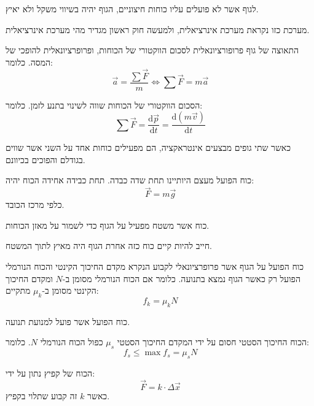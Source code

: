 \documentclass{tstextbook}
\begin{document}
\begin{proposition}
לגוף אשר לא פועלים עליו כוחות חיצוניים, הגוף יהיה בשיווי משקל ולא יאיץ.

\end{proposition}
\begin{remark}
מערכת כזו נקראת מערכת אינרציאלית, ולמעשה חוק ראשון מגדיר מהי מערכת אינרציאלית.

\end{remark}
\begin{proposition}
התאוצה של גוף פרופורציונאלית לסכום הווקטורי של הכוחות, ופרופרציונאלית להופכי של המסה. כלומר:
$$\vec{a}=\frac{\sum \vec{F}}{m}\iff \sum \vec{F}=m\vec{a}$$

\end{proposition}
\begin{corollary}
הסכום הווקטורי של הכוחות שווה לשינוי בתנע לזמן. כלומר:
$$\sum\vec{F}=\frac{\mathrm{d} \vec{p}}{\mathrm{d} t} =\frac{\mathrm{d} \left( m\vec{v} \right)}{\mathrm{d}t } $$

\end{corollary}
\begin{proposition}
כאשר שתי גופים מבצעים אינטראקציה, הם מפעילים כוחות אחד על השני אשר שווים בגודלם והפוכים בכיוונם.

\end{proposition}
\begin{definition}
כוח הפועל מעצם היותיינו תחת שדה כבדה. תחת כבידה אחידה הכוח יהיה:
$$\vec{F}=m\vec{g}$$
כלפי מרכז הכובד. 

\end{definition}
\begin{definition}
כוח אשר משטח מפעיל על הגוף כדי לשמור על מאזן הכוחות.

\end{definition}
\begin{remark}
חייב להיות קיים כוח כזה אחרת הגוף היה מאיץ לתוך המשטח.

\end{remark}
\begin{definition}
כוח הפועל על הגוף אשר פרופרציונאלי לקבוע הנקרא מקדם החיכוך הקינטי והכוח הנורמלי הפועל רק כאשר הגוף נמצא בתנועה. כלומר אם הכוח הנורמלי מסומן ב-\(N\) ומקדם החיכוך הקינטי מסומן ב-\(\mu_{k}\) מתקיים:
$$f_{k}=\mu_{k}N$$

\end{definition}
\begin{definition}
כוח הפועל אשר פועל למנועת תנועה.

\end{definition}
\begin{proposition}
הכוח החיכוך הסטטי חסום על ידי המקדם החיכוך הסטטי \(\mu_{s}\) כפול הכוח הנורמלי \(N\). כלומר:
$$f_{s}\leq \max f_{s}=\mu_{s}N$$

\end{proposition}
\begin{proposition}
הכוח של קפיץ נתון על ידי:
$$\vec{F}=k\cdot \Delta \vec{x}$$
כאשר \(k\) זה קבוע שתלוי בקפיץ.

\end{proposition}
\end{document}
